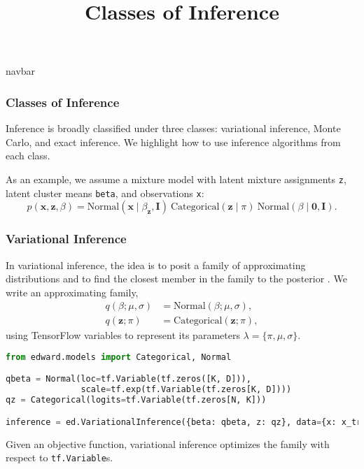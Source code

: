 \title{Classes of Inference}

{{navbar}}

\subsubsection{Classes of Inference}

Inference is broadly classified under three classes: variational
inference, Monte Carlo, and exact inference.
We highlight how to use inference algorithms from each class.

As an example, we assume a mixture model with latent mixture
assignments \texttt{z}, latent cluster means \texttt{beta}, and
observations \texttt{x}:
\begin{equation*}
p(\mathbf{x}, \mathbf{z}, \beta)
=
\text{Normal}(\mathbf{x} \mid \beta_{\mathbf{z}}, \mathbf{I})
~
\text{Categorical}(\mathbf{z}\mid \pi)
~
\text{Normal}(\beta\mid \mathbf{0}, \mathbf{I}).
\end{equation*}

\subsubsection{Variational Inference}

In variational inference, the idea is to posit a family of approximating
distributions and to find the closest member in the family to the
posterior \citep{jordan1999introduction}.
We write an approximating family,
\begin{align*}
q(\beta;\mu,\sigma) &= \text{Normal}(\beta; \mu,\sigma), \\[1.5ex]
q(\mathbf{z};\pi) &= \text{Categorical}(\mathbf{z};\pi),
\end{align*}
using TensorFlow variables to represent its parameters
$\lambda=\{\pi,\mu,\sigma\}$.
\begin{lstlisting}[language=Python]
from edward.models import Categorical, Normal

qbeta = Normal(loc=tf.Variable(tf.zeros([K, D])),
               scale=tf.exp(tf.Variable(tf.zeros[K, D])))
qz = Categorical(logits=tf.Variable(tf.zeros[N, K]))

inference = ed.VariationalInference({beta: qbeta, z: qz}, data={x: x_train})
\end{lstlisting}
Given an objective function, variational inference optimizes the
family with respect to \texttt{tf.Variable}s.

